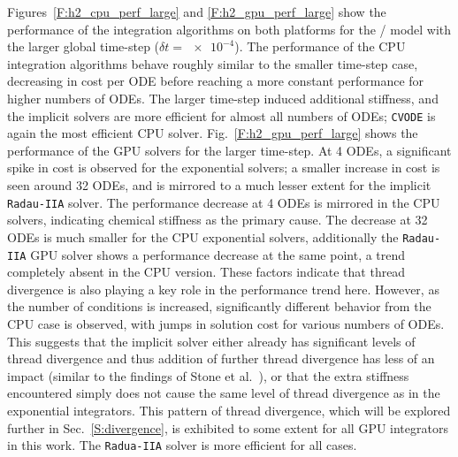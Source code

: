\documentclass[final,twocolumn]{elsarticle}
\begin{document}
Figures~\ref{F:h2_cpu_perf_large} and \ref{F:h2_gpu_perf_large} show the performance of the integration algorithms on both platforms for the \slash{} model with the larger global time-step ($\delta t=\num{e-4}$).
The performance of the CPU integration algorithms behave roughly similar to the smaller time-step case, decreasing in cost per ODE before reaching a more constant performance for higher numbers of ODEs.
The larger time-step induced additional stiffness, and the implicit solvers are more efficient for almost all numbers of ODEs; \texttt{CVODE} is again the most efficient CPU solver.
Fig.~\ref{F:h2_gpu_perf_large} shows the performance of the GPU solvers for the larger time-step.
At \num{4} ODEs, a significant spike in cost is observed for the exponential solvers; a smaller increase in cost is seen around \num{32} ODEs, and is mirrored to a much lesser extent for the implicit \texttt{Radau-IIA} solver.
The performance decrease at \num{4} ODEs is mirrored in the CPU solvers, indicating chemical stiffness as the primary cause.
The decrease at \num{32} ODEs is much smaller for the CPU exponential solvers, additionally the \texttt{Radau-IIA} GPU solver shows a performance decrease at the same point, a trend completely absent in the CPU version.
These factors indicate that thread divergence is also playing a key role in the performance trend here.
However, as the number of conditions is increased, significantly different behavior from the CPU case is observed, with jumps in solution cost for various numbers of ODEs.
This suggests that the implicit solver either already has significant levels of thread divergence and thus addition of further thread divergence has less of an impact (similar to the findings of Stone et al.~\cite{Stone:2013aa}), or that the extra stiffness encountered simply does not cause the same level of thread divergence as in the exponential integrators.
This pattern of thread divergence, which will be explored further in Sec.~\ref{S:divergence}, is exhibited to some extent for all GPU integrators in this work.
The \texttt{Radua-IIA} solver is more efficient for all cases.
\end{document}
